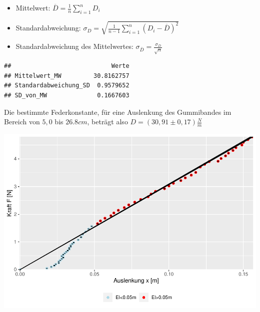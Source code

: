 \documentclass[
]{article}
\newenvironment{Shaded}{\begin{snugshade}}{\end{snugshade}}
\newcommand{\AttributeTok}[1]{\textcolor[rgb]{0.77,0.63,0.00}{#1}}
\newcommand{\CommentTok}[1]{\textcolor[rgb]{0.56,0.35,0.01}{\textit{#1}}}
\newcommand{\FloatTok}[1]{\textcolor[rgb]{0.00,0.00,0.81}{#1}}
\newcommand{\FunctionTok}[1]{\textcolor[rgb]{0.00,0.00,0.00}{#1}}
\newcommand{\NormalTok}[1]{#1}
\newcommand{\OtherTok}[1]{\textcolor[rgb]{0.56,0.35,0.01}{#1}}
\newcommand{\SpecialCharTok}[1]{\textcolor[rgb]{0.00,0.00,0.00}{#1}}
\newcommand{\StringTok}[1]{\textcolor[rgb]{0.31,0.60,0.02}{#1}}
\providecommand{\tightlist}{%
  \setlength{\itemsep}{0pt}\setlength{\parskip}{0pt}}
\begin{document}
\begin{itemize}
\tightlist
\item
  Mittelwert: \(\overline{D} = \frac{1}{n}\sum \limits_{i=1}^nD_i\)
\item
  Standardabweichung:
  \(\sigma_D = \sqrt{\frac{1}{n-1} \sum_{i=1}^n (D_i - \overline{D})^2}\)
\item
  Standardabweichung des Mittelwertes:
  \(\sigma_{\overline{D}}=\frac{\sigma_D}{\sqrt{n}}\)
\end{itemize}

\begin{Shaded}
\end{Shaded}

\begin{verbatim}
##                            Werte
## Mittelwert_MW         30.8162757
## Standardabweichung_SD  0.9579652
## SD_von_MW              0.1667603
\end{verbatim}

Die bestimmte Federkonstante, für eine Auslenkung des Gummibandes im
Bereich von \(5,0\) bis \(26.8cm\), beträgt also
\(D=(30,91\pm 0,17)\frac{N}{m}\)

\includegraphics{DehnbareStoffe_files/figure-latex/unnamed-chunk-10-1.pdf}
\end{document}
